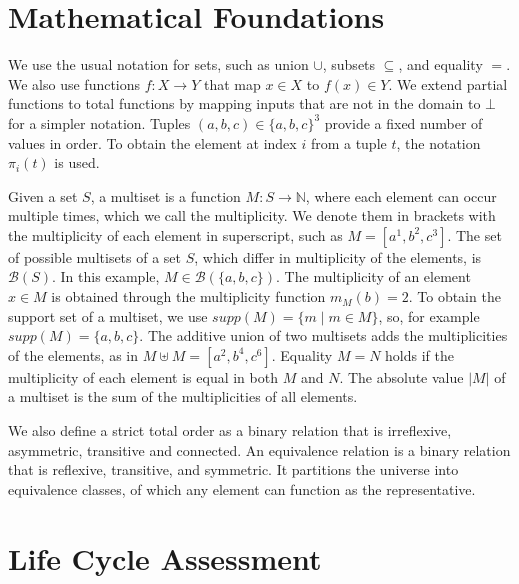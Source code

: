     
    
    \section{Mathematical Foundations}
    
    
    We use the usual notation for sets, such as union $\cup$, subsets $\subseteq$, and equality $=$.
    We also use functions $f: X \to Y$ that map $x \in X$ to $f(x) \in Y$.
    We extend partial functions to total functions by mapping inputs that are not in the domain to $\bot$ for a simpler notation.
    Tuples $(a, b, c) \in \{a, b, c\}^3$ provide a fixed number of values in order. 
    To obtain the element at index $i$ from a tuple $t$, the notation $\pi_i(t)$ is used. 
    
    
    Given a set $S$, a multiset is a function $M: S \to \mathbb{N}$, where each element can occur multiple times, which we call the multiplicity.
    We denote them in brackets with the multiplicity of each element in superscript, such as $M = [a^1, b^2, c^3]$.
    The set of possible multisets of a set $S$, which differ in multiplicity of the elements, is $\mathcal{B}(S)$.
    In this example, $M \in \mathcal{B}(\{a, b, c\})$.
    The multiplicity of an element $x \in M$ is obtained through the multiplicity function $m_M(b) = 2$.
    To obtain the support set of a multiset, we use $supp(M) = \{m \mid m \in M\}$, so, for example $supp(M) = \{a, b, c\}$.
    The additive union of two multisets adds the multiplicities of the elements, as in $M \uplus M = [a^2, b^4, c^6]$.
    Equality $M = N$ holds if the multiplicity of each element is equal in both $M$ and $N$.
    The absolute value $|M|$ of a multiset is the sum of the multiplicities of all elements.

    
    We also define a strict total order as a binary relation that is irreflexive, asymmetric, transitive and connected.
    An equivalence relation is a binary relation that is reflexive, transitive, and symmetric.
    It partitions the universe into equivalence classes, of which any element can function as the representative.
    
    
    
    \section{Life Cycle Assessment}
    \label{chap:prelim-life-cycle-assessment}
    
